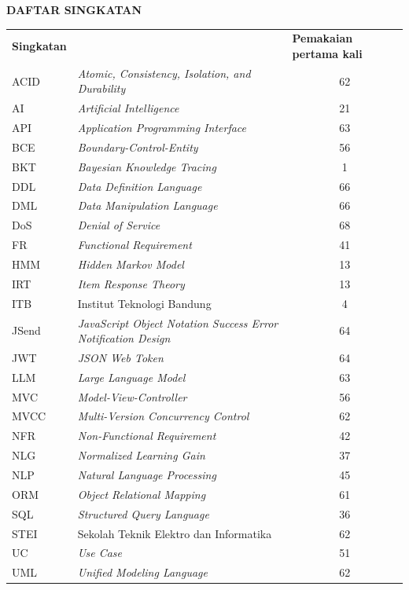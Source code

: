 \cleardoublepage
\vspace{2cm}
\begin{center}
{\fontsize{14}{16.8}\selectfont\textbf{DAFTAR SINGKATAN}}\\[1em]
\end{center}
\label{chap:singkatan}
\setcounter{chapter}{0}
\setcounter{section}{0}
\vspace{2em}

\begin{longtable}{@{} l >{\raggedright\arraybackslash}p{7.5cm} c @{}}
\multicolumn{1}{l}{\textbf{Singkatan}} & \multicolumn{1}{l}{\textbf{Deskripsi}} & \multicolumn{1}{l}{\parbox[c]{3.5cm}{\raggedright \textbf{Pemakaian pertama kali}}} \\

ACID & \textit{Atomic, Consistency, Isolation, and Durability} & 62 \\
AI & \textit{Artificial Intelligence} & 21 \\
API & \textit{Application Programming Interface} & 63 \\
BCE & \textit{Boundary-Control-Entity} & 56 \\
BKT & \textit{Bayesian Knowledge Tracing} & 1 \\
DDL & \textit{Data Definition Language} & 66 \\
DML & \textit{Data Manipulation Language} & 66 \\
DoS & \textit{Denial of Service} & 68 \\
FR & \textit{Functional Requirement} & 41 \\
HMM & \textit{Hidden Markov Model} & 13 \\
IRT & \textit{Item Response Theory} & 13 \\
ITB & Institut Teknologi Bandung & 4 \\
JSend & \textit{JavaScript Object Notation Success Error Notification Design} & 64 \\
JWT & \textit{JSON Web Token} & 64 \\
LLM & \textit{Large Language Model} & 63 \\
MVC & \textit{Model-View-Controller} & 56 \\
MVCC & \textit{Multi-Version Concurrency Control} & 62 \\
NFR & \textit{Non-Functional Requirement} & 42 \\
NLG & \textit{Normalized Learning Gain} & 37 \\
NLP & \textit{Natural Language Processing} & 45 \\
ORM & \textit{Object Relational Mapping} & 61 \\
SQL & \textit{Structured Query Language} & 36 \\
STEI & Sekolah Teknik Elektro dan Informatika & 62 \\
UC & \textit{Use Case} & 51 \\
UML & \textit{Unified Modeling Language} & 62 \\

\end{longtable}
